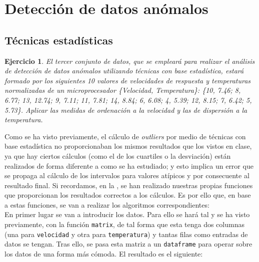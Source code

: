 \documentclass[12pt]{report}\usepackage[]{graphicx}\usepackage[dvipsnames]{xcolor}
\newtheorem{exercise}{Ejercicio}[section]
\begin{document}
		
		\section{Detección de datos anómalos}
		
			\subsection{Técnicas estadísticas}
			
				\begin{exercise}
					El tercer conjunto de datos, que se empleará para realizar el análisis de detección de datos anómalos utilizando técnicas con base estadística, estará formado por los siguientes 10 valores de velocidades de respuesta y temperaturas normalizadas de un microprocesador \{Velocidad, Temperatura\}: \{10, 7.46; 8, 6.77; 13, 12.74; 9, 7.11; 11, 7.81; 14, 8.84; 6, 6.08; 4, 5.39; 12, 8.15; 7, 6.42; 5, 5.73\}. Aplicar las medidas de ordenación a la velocidad y las de dispersión a la temperatura.
				\end{exercise}
				
				Como se ha visto previamente, el cálculo de \textit{outliers} por medio de técnicas con base estadística no proporcionaban los mismos resultados que los vistos en clase, ya que hay ciertos cálculos (como el de los cuartiles o la desviación) están realizados de forma diferente a como se ha estudiado; y esto implica un error que se propaga al cálculo de los intervalos para valores atípicos y por consecuente al resultado final.  Si recordamos, en la , se han realizado nuestras propias funciones que proporcionan los resultados correctos a los cálculos. Es por ello que, en base a estas funciones, se van a realizar los algoritmos correspondientes:\\
				
				En primer lugar se van a introducir los datos. Para ello se hará tal y se ha visto previamente, con la función \texttt{matrix}, de tal forma que esta tenga dos columnas (una para \texttt{velocidad} y otra para \texttt{temperatura}) y tantas filas como entradas de datos se tengan. Tras ello, se pasa esta matriz a un \texttt{dataframe} para operar sobre los datos de una forma más cómoda. El resultado es el siguiente: 
				
\end{document}
